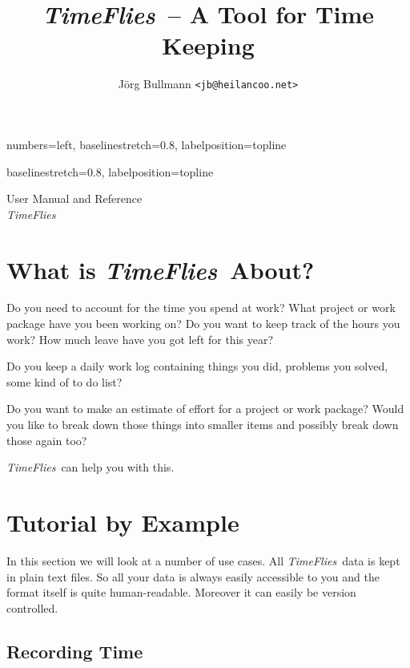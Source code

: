 \documentclass[11pt]{article}
\newcommand{\timeflies}{\emph{TimeFlies}}
\begin{document}
   {numbers=left,
    baselinestretch=0.8,
    labelposition=topline}

   {baselinestretch=0.8,
    labelposition=topline}


\title{\timeflies\ -- A Tool for Time Keeping}
\author{J\"org Bullmann \tt<jb@heilancoo.net>}
\maketitle
\begin{center}
User Manual and Reference\\
\timeflies\ 
\end{center}
\newpage
\tableofcontents
\newpage

\section{What is \timeflies\ About?}

Do you need to account for the time you spend at work? What project or work package have you been working on? Do you want to keep track of the hours you work? How much leave have you got left for this year?

Do you keep a daily work log containing things you did, problems you solved, some kind of to do list?

Do you want to make an estimate of effort for a project or work package? Would you like to break down those things into smaller items and possibly break down those again too?

\timeflies\ can help you with this.

\section{Tutorial by Example}

In this section we will look at a number of use cases. All \timeflies\ data is kept in plain text files. So all your data is always easily accessible to you and the format itself is quite human-readable. Moreover it can easily be version controlled.

\subsection{Recording Time}
\end{document}
